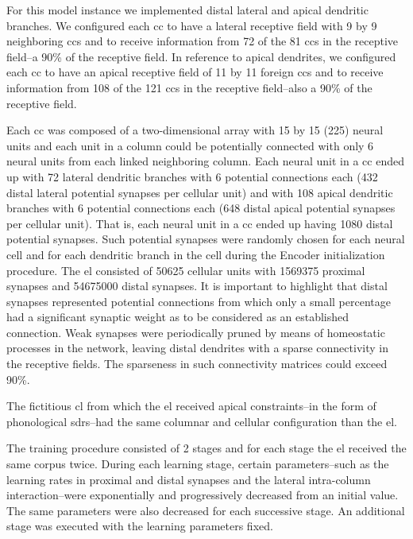 {For this model instance we implemented distal lateral and apical dendritic branches. We configured each \gls{cc} to have a lateral receptive field with 9 by 9 neighboring \glspl{cc}
and to receive information from 72 of the 81 \glspl{cc} in the receptive field--a 90\% of the receptive field. In reference to apical dendrites, we configured each \gls{cc} to have an apical receptive field of 11 by 11 foreign \glspl{cc} and to receive information from 108 of the 121 \glspl{cc} in the receptive field--also a 90\% of the receptive field.

Each \gls{cc} was composed of a two-dimensional array with 15 by 15 (225) neural units and each unit in a column could be potentially connected with only 6 neural units from each linked neighboring column. Each neural unit in a \gls{cc} ended up with 72 lateral dendritic branches with 6 potential connections each (432 distal lateral potential synapses per cellular unit) and with 108 apical dendritic branches with 6 potential connections each (648 distal apical potential synapses per cellular unit). That is, each neural unit in a \gls{cc} ended up having 1080 distal potential synapses. Such potential synapses were randomly chosen for each neural cell and for each dendritic branch in the cell during the Encoder initialization procedure. The \gls{el} consisted of 50625 cellular units with 1569375 proximal synapses and 54675000 distal synapses. It is important to highlight that distal synapses represented potential connections from which only a small percentage had a significant synaptic weight as to be considered as an established connection. Weak synapses were periodically pruned by means of homeostatic processes in the network, leaving distal dendrites with a sparse connectivity in the receptive fields. The sparseness in such connectivity matrices could exceed 90\%.

The fictitious \gls{cl} from which the \gls{el} received apical constraints--in the form of phonological \glspl{sdr}--had the same columnar and cellular configuration than the \gls{el}.

The training procedure consisted of 2 stages and for each stage the \gls{el} received the same corpus twice. During each learning stage, certain parameters--such as the learning rates in proximal and distal synapses and the lateral intra-column interaction--were exponentially and progressively decreased from an initial value. The same parameters were also decreased for each successive stage. An additional stage was executed with the learning parameters fixed.

}
